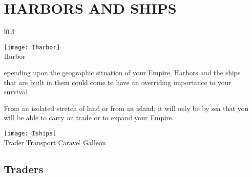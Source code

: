 
\chapter[Harbors and Ships]{\textsf{{\Huge H}ARBORS AND {\Huge S}HIPS}}


\begin{wrapfigure}{l}{0.3\textwidth}
    \vspace{-20pt}
    \begin{center}
        \texttt{[image: Iharbor]} %
        \\ Harbor
    \end{center}
    \vspace{-45pt}
\end{wrapfigure}

epending upon the geographic situation of your Empire, Harbors and the ships that are built in them could come to have an overriding importance to your survival.

From an isolated stretch of land or from an island, it will only be by sea that you will be able to carry on trade or to expand your Empire.


\begin{center}
    \texttt{[image: Iships]} %
    \\ Trader Transport Caravel Galleon
\end{center}

\section{\textsf{Traders}}

